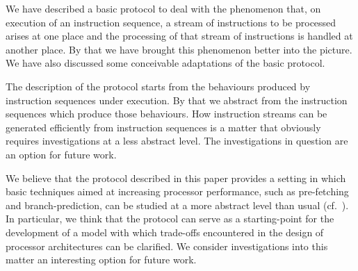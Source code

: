 \documentclass[fleqn]{llncs}
\begin{document}
We have described a basic protocol to deal with the phenomenon that, on
execution of an instruction sequence, a stream of instructions to be
processed arises at one place and the processing of that stream of
instructions is handled at another place.
By that we have brought this phenomenon better into the picture.
We have also discussed some conceivable adaptations of the basic
protocol.

The description of the protocol starts from the behaviours produced by
instruction sequences under execution.
By that we abstract from the instruction sequences which produce those
behaviours.
How instruction streams can be generated efficiently from instruction
sequences is a matter that obviously requires investigations at a less
abstract level.
The investigations in question are an option for future work.

We believe that the protocol described in this paper provides a setting
in which basic techniques aimed at increasing processor performance,
such as pre-fetching and branch-prediction, can be studied at a more
abstract level than usual (cf.~\cite{HP03a}).
In particular, we think that the protocol can serve as a starting-point
for the development of a model with which trade-offs encountered in the
design of processor architectures can be clarified.
We consider investigations into this matter an interesting option for
future work.



\end{document}
